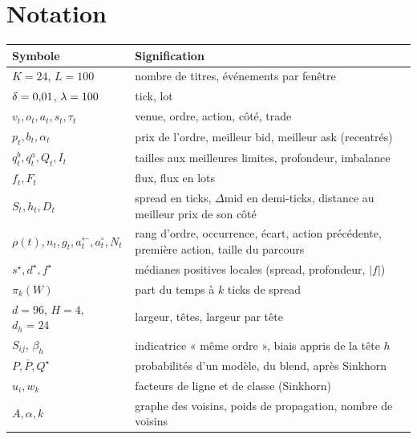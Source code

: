 \section{Notation}
\begin{center}\small
\begin{tabular}{ll}
\toprule
Symbole & Signification\\
\midrule
$K=24$, $L=100$ & nombre de titres, événements par fenêtre\\
$\delta=0{,}01$, $\lambda=100$ & tick, lot\\
$v_t,o_t,a_t,s_t,\tau_t$ & venue, ordre, action, côté, trade\\
$p_t,b_t,\alpha_t$ & prix de l'ordre, meilleur bid, meilleur ask (recentrés)\\
$q^b_t,q^a_t,Q_t,I_t$ & tailles aux meilleures limites, profondeur, imbalance\\
$f_t,F_t$ & flux, flux en lots\\
$S_t,h_t,D_t$ & spread en ticks, $\Delta$mid en demi-ticks, distance au meilleur prix de son côté\\
$\rho(t),n_t,g_t,a^{\leftarrow}_t,a^\circ_t,N_t$ & rang d'ordre, occurrence, écart, action précédente, première action, taille du parcours\\
$s^\star,d^\star,f^\star$ & médianes positives locales (spread, profondeur, $|f|$)\\
$\pi_k(W)$ & part du temps à $k$ ticks de spread\\
$d=96$, $H=4$, $d_h=24$ & largeur, têtes, largeur par tête\\
$S_{ij}$, $\beta_h$ & indicatrice « même ordre », biais appris de la tête $h$\\
$P,\bar P,Q^\star$ & probabilités d'un modèle, du blend, après Sinkhorn\\
$u_i,w_k$ & facteurs de ligne et de classe (Sinkhorn)\\
$A,\alpha,k$ & graphe des voisins, poids de propagation, nombre de voisins\\
\bottomrule
\end{tabular}
\end{center}

